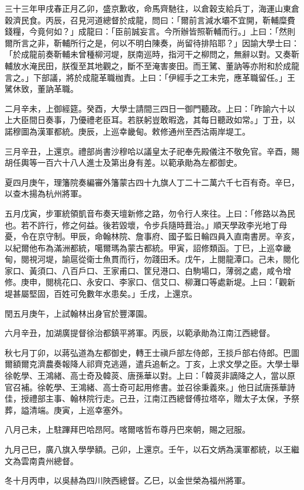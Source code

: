 \begin{pinyinscope}
三十三年甲戌春正月乙卯，盛京歉收，命馬齊馳往，以倉穀支給兵丁，海運山東倉穀濟民食。丙辰，召見河道總督於成龍，問曰：「爾前言減水壩不宜開，靳輔糜費錢糧，今竟何如？」成龍曰：「臣前誠妄言。今所辦皆照靳輔而行。」上曰：「然則爾所言之非，靳輔所行之是，何以不明白陳奏，尚留待排陷耶？」因諭大學士曰：「於成龍前奏靳輔未曾種柳河堤，朕南巡時，指河干之柳問之，無辭以對。又奏靳輔放水淹民田，朕復至其地觀之，斷不至淹害麥田。而王騭、董訥等亦附和於成龍言之。」下部議，將於成龍革職枷責。上曰：「伊經手之工未完，應革職留任。」王騭休致，董訥革職。

二月辛未，上御經筵。癸酉，大學士請間三四日一御門聽政。上曰：「昨諭六十以上大臣間日奏事，乃優禮老臣耳。若朕躬豈敢暇逸，其每日聽政如常。」丁丑，以諾穆圖為漢軍都統。庚辰，上巡幸畿甸。敕修通州至西沽兩岸堤工。

三月辛丑，上還京。禮部尚書沙穆哈以議皇太子祀奉先殿儀注不敬免官。辛酉，賜胡任輿等一百六十八人進士及第出身有差。以範承勛為左都御史。

夏四月庚午，理籓院奏編審外籓蒙古四十九旗人丁二十二萬六千七百有奇。辛巳，以查木揚為杭州將軍。

五月戊寅，步軍統領凱音布奏天壇新修之路，勿令行人來往。上曰：「修路以為民也。若不許行，修之何益。後若毀壞，令步兵隨時葺治。」順天學政李光地丁母憂，令在京守制。甲辰，命翰林院、詹事府、國子監日輪四員入直南書房。辛亥，以紀爾他布為滿洲都統，噶爾瑪為蒙古都統。甲寅，詔修類函。丁巳，上巡幸畿甸，閱視河堤，諭扈從衛士魚貫而行，勿踐田禾。戊午，上閱龍潭口。己未，閱化家口、黃須口、八百戶口、王家甫口、筐兒港口、白駒場口，薄弱之處，咸令增修。庚申，閱桃花口、永安口、李家口、信艾口、柳灘口等處新堤。上曰：「觀新堤甚屬堅固，百姓可免數年水患矣。」壬戌，上還京。

閏五月庚午，上試翰林出身官於豐澤園。

六月辛丑，加湖廣提督徐治都鎮平將軍。丙辰，以範承勛為江南江西總督。

秋七月丁卯，以蔣弘道為左都御史，轉王士禛戶部左侍郎，王掞戶部右侍郎。巴圖爾額爾克濟農奏報降人祁齊克逃遁，遣兵追斬之。丁亥，上求文學之臣。大學士舉徐乾學、王鴻緒、高士奇及韓菼、唐孫華以對。上曰：「韓菼非謫降之人，當以原官召補。徐乾學、王鴻緒、高士奇可起用修書。並召徐秉義來。」他日試唐孫華詩佳，授禮部主事、翰林院行走。己丑，江南江西總督傅拉塔卒，贈太子太保，予祭葬，謚清端。庚寅，上巡幸塞外。

八月己未，上駐蹕拜巴哈昂阿。喀爾喀哲布尊丹巴來朝，賜之冠服。

九月己巳，廣八旗入學學額。己卯，上還京。壬午，以石文炳為漢軍都統，以王繼文為雲南貴州總督。

冬十月丙申，以吳赫為四川陜西總督。乙巳，以金世榮為福州將軍。


\end{pinyinscope}
